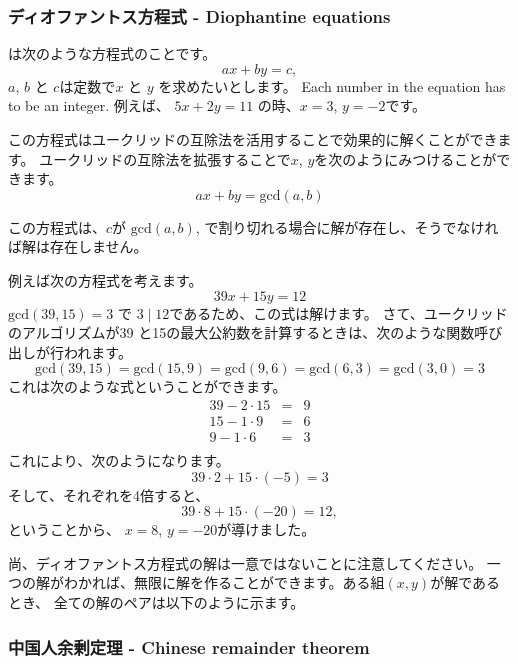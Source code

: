 \subsubsection*{ディオファントス方程式 - Diophantine equations}


は次のような方程式のことです。
\[ ax + by = c, \]
$a$, $b$ と $c$は定数で$x$ と $y$ を求めたいとします。
Each number in the equation has to be an integer.
例えば、
$5x+2y=11$ の時、$x=3$,  $y=-2$です。


この方程式はユークリッドの互除法を活用することで効果的に解くことができます。
ユークリッドの互除法を拡張することで$x$, $y$を次のようにみつけることができます。
\[
ax + by = \textrm{gcd}(a,b)
\]

この方程式は、$c$が
$\textrm{gcd}(a,b)$,
で割り切れる場合に解が存在し、そうでなければ解は存在しません。

例えば次の方程式を考えます。
\[
39x + 15y = 12
\]
$\textrm{gcd}(39,15)=3$ で $3 \mid 12$であるため、この式は解けます。
さて、ユークリッドのアルゴリズムが39 と15の最大公約数を計算するときは、次のような関数呼び出しが行われます。
\[
\textrm{gcd}(39,15) = \textrm{gcd}(15,9)
= \textrm{gcd}(9,6) = \textrm{gcd}(6,3)
= \textrm{gcd}(3,0) = 3 \]
これは次のような式ということができます。
\[
\begin{array}{lcl}
39 - 2 \cdot 15 & = & 9 \\
15 - 1 \cdot 9 & = & 6 \\
9 - 1 \cdot 6 & = & 3 \\
\end{array}
\]
これにより、次のようになります。
\[
39 \cdot 2 + 15 \cdot (-5) = 3
\]
そして、それぞれを4倍すると、
\[
39 \cdot 8 + 15 \cdot (-20) = 12,
\]
ということから、
$x=8$, $y=-20$が導けました。

尚、ディオファントス方程式の解は一意ではないことに注意してください。
一つの解がわかれば、無限に解を作ることができます。ある組$(x,y)$が解であるとき、
全ての解のペアは以下のように示ます。

\subsubsection{中国人余剰定理 - Chinese remainder theorem}


